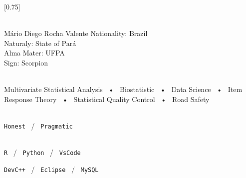 \documentclass[lighthipster]{simplehipstercv}
\begin{document}
\setlength{\columnsep}{1.5cm}
[0.75]
\begin{paracol}{2}

\paracolbackgroundoptions



\footnotesize
{\setasidefontcolour
\flushright
\begin{center}
\end{center}



{\footnotesize }
\bigskip

 \\[0.5em]
Mário Diego Rocha Valente
Nationality: Brazil \\
Naturaly: State of Pará \\
Alma Mater: UFPA \\
Sign: Scorpion

\bigskip

 \\[0.5em]

Multivariate Statistical Analysis ~•~ Biostatistic ~•~ Data Science ~•~ Item Response Theory ~•~  Statistical Quality Control ~•~ Road Safety

\bigskip

\\[0.5em]

\texttt{Honest} ~/~ \texttt{Pragmatic}  


\bigskip

\\[0.5em]

\texttt{R} ~/~ \texttt{Python} ~/~ \texttt{VsCode}

\texttt{DevC++} ~/~ \texttt{Eclipse} ~/~ \texttt{MySQL}



\vspace{4em}


\phantom{turn the page}
\phantom{turn the page}
}
\switchcolumn


\end{paracol}
\end{document}
